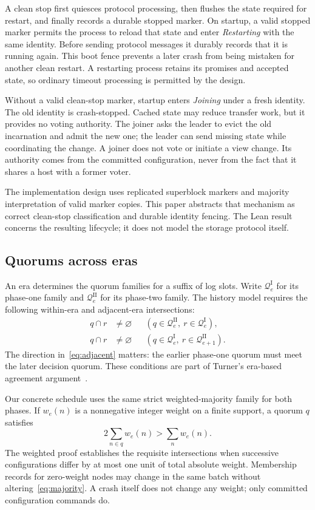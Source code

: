 \documentclass[10pt,journal,letterpaper]{IEEEtran}
\newcommand{\QI}{\mathcal{Q}^{\mathrm I}}
\newcommand{\QII}{\mathcal{Q}^{\mathrm {II}}}
\begin{document}
A clean stop first quiesces protocol processing, then flushes the state required for restart, and finally records a durable stopped marker. On startup, a valid stopped marker permits the process to reload that state and enter \emph{Restarting} with the same identity. Before sending protocol messages it durably records that it is running again. This boot fence prevents a later crash from being mistaken for another clean restart. A restarting process retains its promises and accepted state, so ordinary timeout processing is permitted by the design.

Without a valid clean-stop marker, startup enters \emph{Joining} under a fresh identity. The old identity is crash-stopped. Cached state may reduce transfer work, but it provides no voting authority. The joiner asks the leader to evict the old incarnation and admit the new one; the leader can send missing state while coordinating the change. A joiner does not vote or initiate a view change. Its authority comes from the committed configuration, never from the fact that it shares a host with a former voter.

The implementation design uses replicated superblock markers and majority interpretation of valid marker copies. This paper abstracts that mechanism as correct clean-stop classification and durable identity fencing. The Lean result concerns the resulting lifecycle; it does not model the storage protocol itself.

\subsection{Quorums across eras}
An era determines the quorum families for a suffix of log slots. Write $\QI_e$ for its phase-one family and $\QII_e$ for its phase-two family. The history model requires the following within-era and adjacent-era intersections:
\begin{align}
q\cap r&\ne\varnothing
&& (q\in\QII_e,\ r\in\QI_e),\label{eq:same}\\
q\cap r&\ne\varnothing
&& (q\in\QI_e,\ r\in\QII_{e+1}).\label{eq:adjacent}
\end{align}
The direction in~\eqref{eq:adjacent} matters: the earlier phase-one quorum must meet the later decision quorum. These conditions are part of Turner's era-based agreement argument~\cite{turner}.

Our concrete schedule uses the same strict weighted-majority family for both phases. If $w_e(n)$ is a nonnegative integer weight on a finite support, a quorum $q$ satisfies
\begin{equation}
2\sum_{n\in q}w_e(n)>\sum_n w_e(n).
\label{eq:majority}
\end{equation}
The weighted proof establishes the requisite intersections when successive configurations differ by at most one unit of total absolute weight. Membership records for zero-weight nodes may change in the same batch without altering~\eqref{eq:majority}. A crash itself does not change any weight; only committed configuration commands do.
\end{document}
